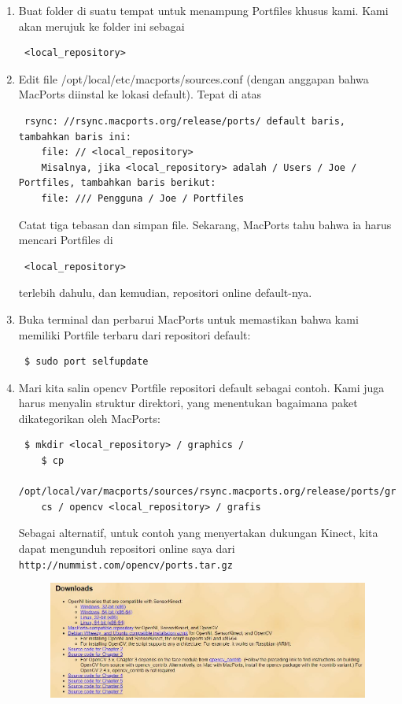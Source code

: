\begin{enumerate}
	\item Buat folder di suatu tempat untuk menampung Portfiles khusus kami. Kami akan merujuk ke folder ini sebagai \begin{verbatim} <local_repository> \end{verbatim}
	\item Edit file /opt/local/etc/macports/sources.conf (dengan anggapan bahwa MacPorts diinstal ke lokasi default). Tepat di atas
	\begin{verbatim} rsync: //rsync.macports.org/release/ports/ default baris, tambahkan baris ini:
	file: // <local_repository>
	Misalnya, jika <local_repository> adalah / Users / Joe / Portfiles, tambahkan baris berikut:
	file: /// Pengguna / Joe / Portfiles \end{verbatim}
	Catat tiga tebasan dan simpan file. Sekarang, MacPorts tahu bahwa ia harus mencari Portfiles di \begin{verbatim} <local_repository> \end{verbatim} terlebih dahulu, dan kemudian, repositori online default-nya.
	\item Buka terminal dan perbarui MacPorts untuk memastikan bahwa kami memiliki Portfile terbaru dari repositori default:
	\begin{verbatim} $ sudo port selfupdate \end{verbatim}
	\item Mari kita salin opencv Portfile repositori default sebagai contoh. Kami juga harus menyalin struktur direktori, yang menentukan bagaimana paket dikategorikan oleh MacPorts:
	\begin{verbatim} $ mkdir <local_repository> / graphics /
	$ cp
	/opt/local/var/macports/sources/rsync.macports.org/release/ports/graphi
	cs / opencv <local_repository> / grafis \end{verbatim}
\newpage
	Sebagai alternatif, untuk contoh yang menyertakan dukungan Kinect, kita dapat mengunduh repositori online saya dari \verb|http://nummist.com/opencv/ports.tar.gz|
		\begin{figure}[ht]
		\centering
		\includegraphics[scale=0.3]{figures/1,12.jpg}

\end{figure}
\end{enumerate}
